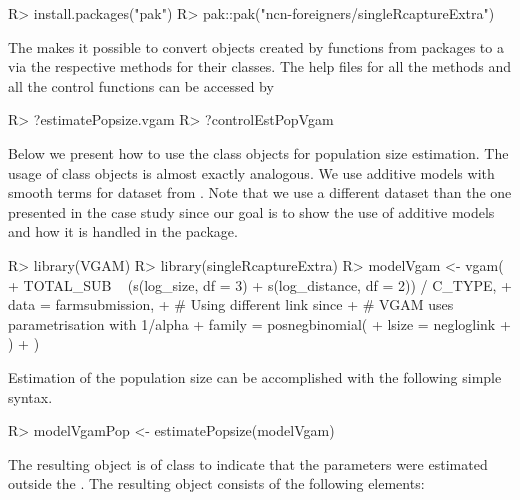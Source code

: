 \documentclass[nojss]{jss}
\newcommand{\1}{\mathcal{I}} \newcommand{\bZero}{\boldsymbol{0}}
\begin{document}
\begin{CodeChunk}
\begin{CodeInput}
R> install.packages("pak")
R> pak::pak("ncn-foreigners/singleRcaptureExtra")
\end{CodeInput}
\end{CodeChunk}

The  makes it possible to convert objects
created by  functions from packages
 to a  via the
respective  methods for their classes. The help
files for all the methods and all the control functions can be accessed
by

\begin{CodeChunk}
\begin{CodeInput}
R> ?estimatePopsize.vgam
R> ?controlEstPopVgam
\end{CodeInput}
\end{CodeChunk}

Below we present how to use the  class objects for
population size estimation. The usage of  class objects
is almost exactly analogous. We use additive models with smooth terms
for dataset from \cite{chao-generalization}. Note that we use a
different dataset than the one presented in the case study since our
goal is to show the use of additive models and how it is handled in the
 package.

\begin{CodeChunk}
\begin{CodeInput}
R> library(VGAM)
R> library(singleRcaptureExtra)
R> modelVgam <- vgam(
+   TOTAL_SUB ~ (s(log_size, df  = 3) + s(log_distance, df  = 2)) / C_TYPE,
+   data = farmsubmission,
+   # Using different link since
+   # VGAM uses parametrisation with 1/alpha
+   family = posnegbinomial(
+     lsize = negloglink
+   )
+ )
\end{CodeInput}
\end{CodeChunk}

Estimation of the population size can be accomplished with the following
simple syntax.

\begin{CodeChunk}
\begin{CodeInput}
R> modelVgamPop <- estimatePopsize(modelVgam)
\end{CodeInput}
\end{CodeChunk}

The resulting object is of class  to indicate that
the parameters were estimated outside the . The
resulting object consists of the following elements:
\end{document}
